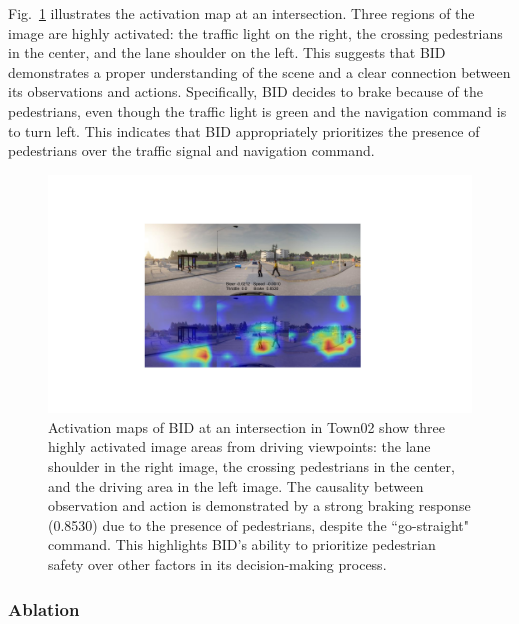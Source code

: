 Fig.~\ref{fig:attention_ped_greed} illustrates the activation map at an intersection. 
Three regions of the image are highly activated: the traffic light on the right, the crossing pedestrians in the center, and the lane shoulder on the left. 
This suggests that BID demonstrates a proper understanding of the scene and a clear connection between its observations and actions. 
Specifically, BID decides to brake because of the pedestrians, even though the traffic light is green and the navigation command is to turn left. 
This indicates that BID appropriately prioritizes the presence of pedestrians over the traffic signal and navigation command.


\begin{figure}[ht!]
	\centering
	\includegraphics[width=\linewidth]{fig/attention_ped_greed.pdf}
	\caption{Activation maps of BID at an intersection in Town02 show three highly activated image areas from driving viewpoints: 
		the lane shoulder in the right image, the crossing pedestrians in the center, and the driving area in the left image. 
		The causality between observation and action is demonstrated by a strong braking response (0.8530) due to the presence of pedestrians, despite the ``go-straight" command. 
		This highlights BID's ability to prioritize pedestrian safety over other factors in its decision-making process.}
	\label{fig:attention_ped_greed}
\end{figure}



\subsubsection{Ablation}

